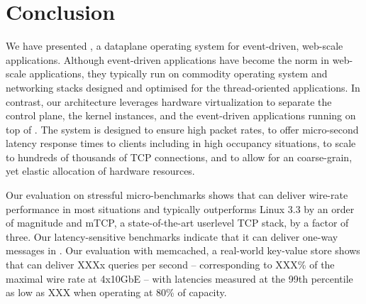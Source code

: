 
\section{Conclusion}

We have presented \ix, a dataplane operating system for event-driven,
web-scale applications.  Although event-driven applications have
become the norm in web-scale applications, they typically run on
commodity operating system and networking stacks designed and
optimised for the thread-oriented applications.  In contrast, our
architecture leverages hardware virtualization to separate the control
plane, the \ix kernel instances, and the event-driven applications
running on top of \ix.  The system is designed to ensure high packet
rates, to offer micro-second latency response times to clients
including in high occupancy situations, to scale to hundreds of
thousands of TCP connections, and to allow for an coarse-grain, yet
elastic allocation of hardware resources.

Our evaluation on stressful micro-benchmarks shows that \ix can
deliver wire-rate performance in most situations and typically
outperforms Linux 3.3 by an order of magnitude and mTCP, a
state-of-the-art userlevel TCP stack, by a factor of three.  Our
latency-sensitive benchmarks indicate that it can deliver one-way
messages in \microsecond.  Our evaluation with memcached, a
real-world key-value store shows that \ix can deliver XXXx queries per
second -- corresponding to XXX\% of the maximal wire rate at 4x10GbE -- with
latencies measured at the 99th percentile as low as XXX when operating
at 80\% of capacity. 


